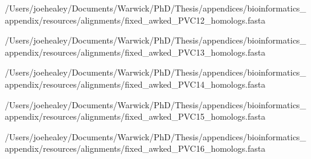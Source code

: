\begin{texshade}{/Users/joehealey/Documents/Warwick/PhD/Thesis/appendices/bioinformatics_appendix/resources/alignments/fixed_awked_PVC12_homologs.fasta}
\noblockskip
\hideconsensus
\end{texshade}

\begin{texshade}{/Users/joehealey/Documents/Warwick/PhD/Thesis/appendices/bioinformatics_appendix/resources/alignments/fixed_awked_PVC13_homologs.fasta}
\noblockskip
\hideconsensus
\end{texshade}

\begin{texshade}{/Users/joehealey/Documents/Warwick/PhD/Thesis/appendices/bioinformatics_appendix/resources/alignments/fixed_awked_PVC14_homologs.fasta}
\noblockskip
\hideconsensus
\end{texshade}

\begin{texshade}{/Users/joehealey/Documents/Warwick/PhD/Thesis/appendices/bioinformatics_appendix/resources/alignments/fixed_awked_PVC15_homologs.fasta}
\noblockskip
\hideconsensus
\end{texshade}

\begin{texshade}{/Users/joehealey/Documents/Warwick/PhD/Thesis/appendices/bioinformatics_appendix/resources/alignments/fixed_awked_PVC16_homologs.fasta}
\noblockskip
\hideconsensus
\end{texshade}